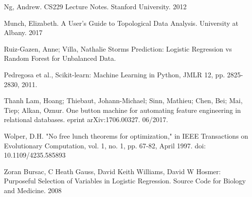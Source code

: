 \documentclass{llncs}
\begin{document}
\begin{thebibliography}{19}
Ng, Andrew. CS229 Lecture Notes. Stanford University. 2012

Munch, Elizabeth. A User’s Guide to Topological Data Analysis. University at Albany. 2017

Ruiz-Gazen, Anne; Villa, Nathalie Storms Prediction: Logistic Regression vs Random Forest for Unbalanced Data.

Pedregosa et al., Scikit-learn: Machine Learning in Python, JMLR 12, pp. 2825-2830, 2011.

Thanh Lam, Hoang; Thiebaut, Johann-Michael; Sinn, Mathieu; Chen, Bei; Mai, Tiep; Alkan, Oznur.  One button machine for automating feature engineering in relational databases. eprint arXiv:1706.00327. 06/2017.

Wolper, D.H. "No free lunch theorems for optimization," in IEEE Transactions on Evolutionary Computation, vol. 1, no. 1, pp. 67-82, April 1997. doi: 10.1109/4235.585893

Zoran Bursac, C Heath Gauss, David Keith Williams, David W Hosmer: Purposeful Selection of Variables in Logistic Regression. Source Code for Biology and Medicine. 2008

\end{thebibliography}
\end{document}
